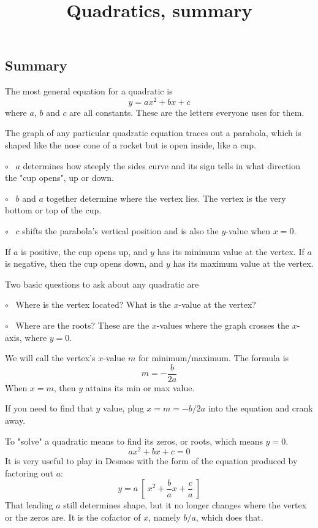 \documentclass[11pt, oneside]{article}
\title{Quadratics, summary}
\date{}
\begin{document}
\maketitle
\Large


\subsection*{Summary}

The most general equation for a quadratic is
\[ y = ax^2 + bx + c \]
where $a$, $b$ and $c$ are all constants.  These are the letters everyone uses for them.

The graph of any particular quadratic equation traces out a parabola, which is shaped like the nose cone of a rocket but is open inside, like a cup.

$\circ$ \ $a$ determines how steeply the sides curve and its sign tells in what direction the "cup opens", up or down.

$\circ$ \ $b$ and $a$ together determine where the vertex lies.  The vertex is the very bottom or top of the cup.

$\circ$ \ $c$ shifts the parabola's vertical position and is also the $y$-value when $x = 0$.

If $a$ is positive, the cup opens up, and $y$ has its minimum value at the vertex.  If $a$ is negative, then the cup opens down, and $y$ has its maximum value at the vertex.

Two basic questions to ask about any quadratic are

$\circ$ \ Where is the vertex located? What is the $x$-value at the vertex?

$\circ$ \ Where are the roots?  These are the $x$-values where the graph crosses the $x$-axis, where $y = 0$.

We will call the vertex's $x$-value $m$ for minimum/maximum.  The formula is
\[ m = - \frac{b}{2a} \]
When $x=m$, then $y$ attains its min or max value.  

If you need to find that $y$ value, plug $x = m = -b/2a$ into the equation and crank away.

To "solve" a quadratic means to find its zeros, or roots, which means $y = 0$.
\[ ax^2 + bx + c = 0 \]
It is very useful to play in Desmos with the form of the equation produced by factoring out $a$:
\[ y = a \ [ \ x^2 + \frac{b}{a}x + \frac{c}{a} \ ]  \]
That leading $a$ still determines shape, but it no longer changes where the vertex or the zeros are.  It is the cofactor of $x$, namely $b/a$, which does that.  
\end{document}
